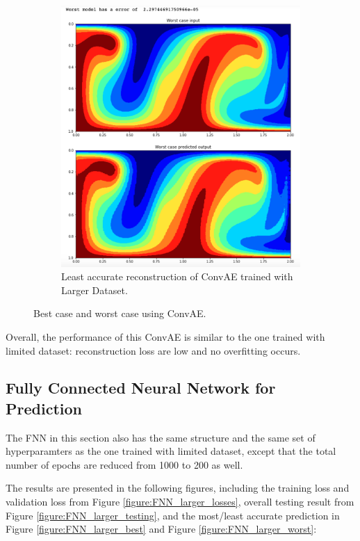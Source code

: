 \begin{figure}[H]
\begin{subfigure}{0.45\textwidth}
    \includegraphics[width=\textwidth]{figures/mantle_convection_images/larger_dataset/ConvAE_Worst.png}
    \caption{Least accurate reconstruction of ConvAE trained with Larger Dataset.}
\end{subfigure}   
\caption{Best case and worst case using ConvAE.}
\label{figure:ConvAE_larger_best_worst}
\end{figure}

Overall, the performance of this ConvAE is similar to the one trained with limited dataset: reconstruction loss are low and no overfitting occurs.


\subsection{Fully Connected Neural Network for Prediction}

The FNN in this section also has the same structure and the same set of hyperparamters as the one trained with limited dataset, except that the total number of epochs are reduced from 1000 to 200 as well.

The results are presented in the following figures, including the training loss and validation loss from Figure \ref{figure:FNN_larger_losses}, overall testing result from Figure \ref{figure:FNN_larger_testing}, and the most/least accurate prediction in Figure \ref{figure:FNN_larger_best} and Figure \ref{figure:FNN_larger_worst}:

